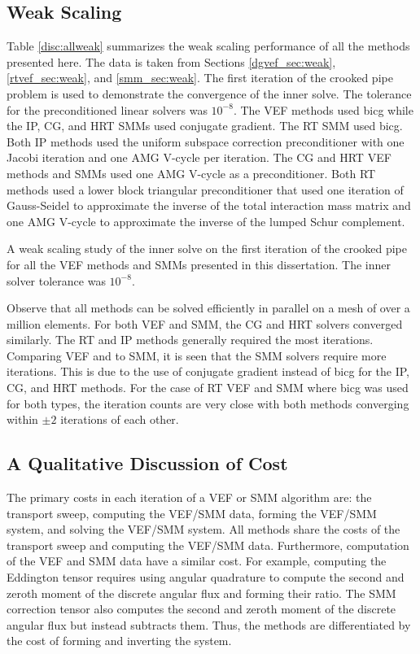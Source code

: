 \documentclass[../doc.tex]{subfiles}
\begin{document}
\subsection{Weak Scaling}
Table \ref{disc:allweak} summarizes the weak scaling performance of all the methods presented here. The data is taken from Sections \ref{dgvef_sec:weak}, \ref{rtvef_sec:weak}, and \ref{smm_sec:weak}. The first iteration of the crooked pipe problem is used to demonstrate the convergence of the inner solve. The tolerance for the preconditioned linear solvers was $10^{-8}$. The VEF methods used \gls{bicg} while the IP, CG, and HRT SMMs used conjugate gradient. The RT SMM used \gls{bicg}. Both IP methods used the uniform subspace correction preconditioner with one Jacobi iteration and one AMG V-cycle per iteration. The CG and HRT VEF methods and SMMs used one AMG V-cycle as a preconditioner. Both RT methods used a lower block triangular preconditioner that used one iteration of Gauss-Seidel to approximate the inverse of the total interaction mass matrix and one AMG V-cycle to approximate the inverse of the lumped Schur complement. 
\begin{table}
\centering
\caption{A weak scaling study of the inner solve on the first iteration of the crooked pipe for all the VEF methods and SMMs presented in this dissertation. The inner solver tolerance was $10^{-8}$.}
\label{disc:allweak}

\end{table}

Observe that all methods can be solved efficiently in parallel on a mesh of over a million elements. For both VEF and SMM, the CG and HRT solvers converged similarly. The RT and IP methods generally required the most iterations. Comparing VEF and to SMM, it is seen that the SMM solvers require more iterations. This is due to the use of conjugate gradient instead of \gls{bicg} for the IP, CG, and HRT methods. For the case of RT VEF and SMM where \gls{bicg} was used for both types, the iteration counts are very close with both methods converging within $\pm 2$ iterations of each other. 

\subsection{A Qualitative Discussion of Cost}
The primary costs in each iteration of a VEF or SMM algorithm are: the transport sweep, computing the VEF/SMM data, forming the VEF/SMM system, and solving the VEF/SMM system. All methods share the costs of the transport sweep and computing the VEF/SMM data. Furthermore, computation of the VEF and SMM data have a similar cost. For example, computing the Eddington tensor requires using angular quadrature to compute the second and zeroth moment of the discrete angular flux and forming their ratio. The SMM correction tensor also computes the second and zeroth moment of the discrete angular flux but instead subtracts them. Thus, the methods are differentiated by the cost of forming and inverting the system. 
\end{document}
